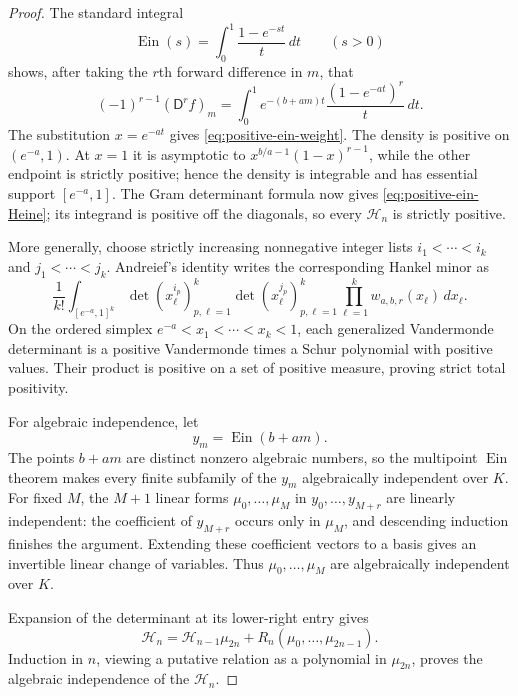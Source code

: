 \documentclass[11pt]{article}
\theoremstyle{definition}
\theoremstyle{remark}
\newcommand{\Ein}{\operatorname{Ein}}
\begin{document}
\begin{proof}
The standard integral
\[
 \Ein(s)=\int_0^1\frac{1-e^{-st}}t\,dt\qquad(s>0)
\]
shows, after taking the $r$th forward difference in $m$, that
\[
 (-1)^{r-1}(\mathsf D^rf)_m
 =\int_0^1e^{-(b+am)t}\frac{(1-e^{-at})^r}{t}\,dt.
\]
The substitution $x=e^{-at}$ gives
\eqref{eq:positive-ein-weight}.  The density is positive on
$(e^{-a},1)$.  At $x=1$ it is asymptotic to
$x^{b/a-1}(1-x)^{r-1}$, while the other endpoint is strictly positive;
hence the density is integrable and has essential support
$[e^{-a},1]$.  The Gram determinant formula now gives
\eqref{eq:positive-ein-Heine}; its integrand is positive off the
diagonals, so every $\mathcal H_n$ is strictly positive.

More generally, choose strictly increasing nonnegative integer lists
$i_1<\cdots<i_k$ and $j_1<\cdots<j_k$.  Andreief's identity writes the
corresponding Hankel minor as
\[
 \frac1{k!}\int_{[e^{-a},1]^k}
 \det(x_\ell^{i_p})_{p,\ell=1}^k
 \det(x_\ell^{j_p})_{p,\ell=1}^k
 \prod_{\ell=1}^kw_{a,b,r}(x_\ell)\,dx_\ell.
\]
On the ordered simplex $e^{-a}<x_1<\cdots<x_k<1$, each generalized
Vandermonde determinant is a positive Vandermonde times a Schur
polynomial with positive values.  Their product is positive on a set of
positive measure, proving strict total positivity.

For algebraic independence, let
\[
 y_m=\Ein(b+am).
\]
The points $b+am$ are distinct nonzero algebraic numbers, so the
multipoint $\Ein$ theorem makes every finite subfamily of the $y_m$
algebraically independent over $K$.  For fixed $M$, the $M+1$ linear
forms $\mu_0,\ldots,\mu_M$ in
$y_0,\ldots,y_{M+r}$ are linearly independent: the coefficient of
$y_{M+r}$ occurs only in $\mu_M$, and descending induction finishes the
argument.  Extending these coefficient vectors to a basis gives an
invertible linear change of variables.  Thus
$\mu_0,\ldots,\mu_M$ are algebraically independent over $K$.

Expansion of the determinant at its lower-right entry gives
\begin{equation}\label{eq:positive-ein-Hankel-triangular}
 \mathcal H_n=\mathcal H_{n-1}\mu_{2n}
 +R_n(\mu_0,\ldots,\mu_{2n-1}).
\end{equation}
Induction in $n$, viewing a putative relation as a polynomial in
$\mu_{2n}$, proves the algebraic independence of the $\mathcal H_n$.


\end{proof}
\end{document}
